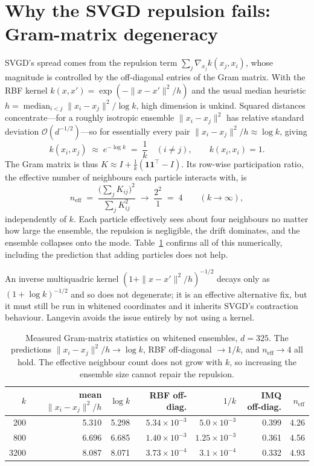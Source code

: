 \documentclass[11pt]{article}
\begin{document}
\section{Why the SVGD repulsion fails: Gram-matrix degeneracy}
\label{sec:gram}

SVGD's spread comes from the repulsion term $\sum_j \nabla_{x_j} k(x_j, x_i)$, whose magnitude is
controlled by the off-diagonal entries of the Gram matrix. With the RBF kernel
$k(x,x') = \exp(-\|x-x'\|^2/h)$ and the usual median heuristic
$h = \operatorname{median}_{i<j}\|x_i-x_j\|^2 / \log k$, high dimension is unkind. Squared
distances concentrate---for a roughly isotropic ensemble $\|x_i-x_j\|^2$ has relative standard
deviation $\mathcal{O}(d^{-1/2})$---so for essentially every pair
$\|x_i-x_j\|^2/h \approx \log k$, giving
\begin{equation}
  k(x_i,x_j) \;\approx\; e^{-\log k} \;=\; \frac{1}{k}\quad (i\neq j),
  \qquad k(x_i,x_i) = 1 .
\end{equation}
The Gram matrix is thus $K \approx I + \tfrac1k(\mathbf{1}\mathbf{1}^{\!\top}-I)$. Its row-wise
participation ratio, the effective number of neighbours each particle interacts with, is
\begin{equation}
  n_{\text{eff}} \;=\; \frac{\big(\sum_j K_{ij}\big)^2}{\sum_j K_{ij}^2}
  \;\longrightarrow\; \frac{2^2}{1} \;=\; 4 \qquad (k \to \infty),
\end{equation}
independently of $k$. Each particle effectively sees about four neighbours no matter how large the
ensemble, the repulsion is negligible, the drift dominates, and the ensemble collapses onto the
mode. Table~\ref{tab:gram} confirms all of this numerically, including the prediction that adding
particles does not help.

An inverse multiquadric kernel $(1+\|x-x'\|^2/h)^{-1/2}$ decays only as $(1+\log k)^{-1/2}$ and so
does not degenerate; it is an effective alternative fix, but it must still be run in whitened
coordinates and it inherits SVGD's contraction behaviour. Langevin avoids the issue entirely by
not using a kernel.

\begin{table}[t]
\centering
\begin{tabular}{rrrrrrr}
\toprule
$k$ & mean $\|x_i-x_j\|^2/h$ & $\log k$ & RBF off-diag. & $1/k$ & IMQ off-diag. & $n_{\text{eff}}$ \\
\midrule
 200 & 5.310 & 5.298 & $5.34\times10^{-3}$ & $5.0\times10^{-3}$ & 0.399 & 4.26 \\
 800 & 6.696 & 6.685 & $1.40\times10^{-3}$ & $1.25\times10^{-3}$ & 0.361 & 4.56 \\
3200 & 8.087 & 8.071 & $3.73\times10^{-4}$ & $3.1\times10^{-4}$ & 0.332 & 4.93 \\
\bottomrule
\end{tabular}
\caption{Measured Gram-matrix statistics on whitened ensembles, $d=325$. The predictions
$\|x_i-x_j\|^2/h \to \log k$, RBF off-diagonal $\to 1/k$, and $n_{\text{eff}} \to 4$ all hold. The
effective neighbour count does not grow with $k$, so increasing the ensemble size cannot repair
the repulsion.}
\label{tab:gram}
\end{table}
\end{document}

